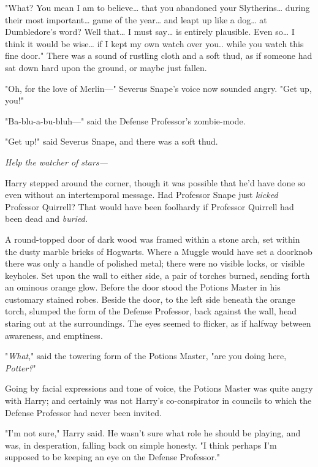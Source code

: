 "What? You mean I am to believe{\ldots} that you abandoned your 
Slytherins{\ldots} during their most important{\ldots} game of the year{\ldots} 
and leapt up like a dog{\ldots} at Dumbledore's word? Well that{\ldots} I must 
say{\ldots} is entirely plausible. Even so{\ldots} I think it would be 
wise{\ldots} if I kept my own watch over you.. while you watch this fine door." 
There was a sound of rustling cloth and a soft thud, as if someone had sat down 
hard upon the ground, or maybe just fallen.

"Oh, for the love of Merlin---" Severus Snape's voice now sounded angry. "Get 
up, you!"

"Ba-blu-a-bu-bluh---" said the Defense Professor's zombie-mode.

"Get up!" said Severus Snape, and there was a soft thud.

\emph{Help the watcher of stars---}

Harry stepped around the corner, though it was possible that he'd have done so 
even without an intertemporal message. Had Professor Snape just \emph{kicked} 
Professor Quirrell? That would have been foolhardy if Professor Quirrell had 
been dead and \emph{buried.}

A round-topped door of dark wood was framed within a stone arch, set within the 
dusty marble bricks of Hogwarts. Where a Muggle would have set a doorknob there 
was only a handle of polished metal; there were no visible locks, or visible 
keyholes. Set upon the wall to either side, a pair of torches burned, sending 
forth an ominous orange glow. Before the door stood the Potions Master in his 
customary stained robes. Beside the door, to the left side beneath the orange 
torch, slumped the form of the Defense Professor, back against the wall, head 
staring out at the surroundings. The eyes seemed to flicker, as if halfway 
between awareness, and emptiness.

"\emph{What}," said the towering form of the Potions Master, "are you doing 
here, \emph{Potter?}"

Going by facial expressions and tone of voice, the Potions Master was quite 
angry with Harry; and certainly was not Harry's co-conspirator in councils to 
which the Defense Professor had never been invited.

"I'm not sure," Harry said. He wasn't sure what role he should be playing, and 
was, in desperation, falling back on simple honesty. "I think perhaps I'm 
supposed to be keeping an eye on the Defense Professor."

